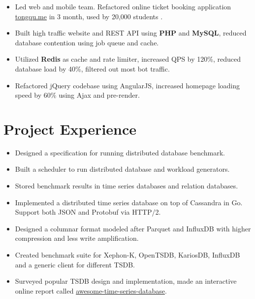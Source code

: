\documentclass[11pt, letterpaper]{simple-cv}
\begin{document}
\begin{itemize}
	\item Led web and mobile team. Refactored online ticket booking application \href{https://tongqu.me}{tongqu.me} in 3 month, used by 20,000 students .
	\item Built high traffic website and REST API using \textbf{PHP} and \textbf{MySQL}, reduced database contention using job queue and cache.
	\item Utilized \textbf{Redis} as cache and rate limiter, increased QPS by 120\%, reduced database load by 40\%, filtered out most bot traffic.
	\item Refactored jQuery codebase using AngularJS, increased homepage loading speed by 60\% using Ajax and pre-render.
\end{itemize}

\section{Project Experience}



\begin{itemize}
	\item Designed a specification for running distributed database benchmark.
	\item Built a scheduler to run distributed database and workload generators.
	\item Stored benchmark results in time series databases and relation databases.
\end{itemize}



\begin{itemize}
	\item Implemented a distributed time series database on top of Cassandra in Go. Support both JSON and Protobuf via HTTP/2.
	\item Designed a columnar format modeled after Parquet and InfluxDB with higher compression and less write amplification.
	\item Created benchmark suite for Xephon-K, OpenTSDB, KariosDB, InfluxDB and a generic client for different TSDB.
	\item Surveyed popular TSDB design and implementation, made an interactive online report called \href{https://xephonhq.github.io/awesome-time-series-database}{awesome-time-series-database}.
\end{itemize}
\end{document}
